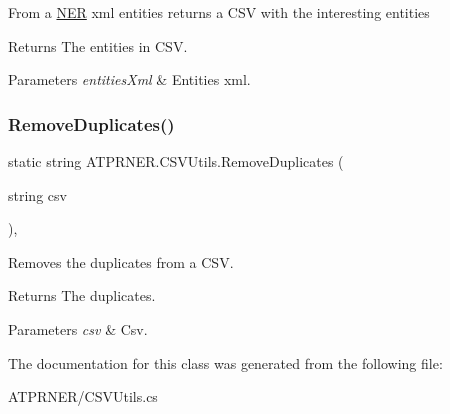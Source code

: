 From a \hyperlink{class_a_t_p_r_n_e_r_1_1_n_e_r}{N\+ER} xml entities returns a C\+SV with the interesting entities 

\begin{DoxyReturn}{Returns}
The entities in C\+SV.
\end{DoxyReturn}

\begin{DoxyParams}{Parameters}
{\em entities\+Xml} & Entities xml.\\
\hline
\end{DoxyParams}
\hypertarget{class_a_t_p_r_n_e_r_1_1_c_s_v_utils_ab236c362e83053e0e7165aa2e45849c4}{}\label{class_a_t_p_r_n_e_r_1_1_c_s_v_utils_ab236c362e83053e0e7165aa2e45849c4} 
\subsubsection{\texorpdfstring{Remove\+Duplicates()}{RemoveDuplicates()}}
{\footnotesize\ttfamily static string A\+T\+P\+R\+N\+E\+R.\+C\+S\+V\+Utils.\+Remove\+Duplicates (\begin{DoxyParamCaption}\item[{string}]{csv }\end{DoxyParamCaption})\hspace{0.3cm}{\ttfamily [inline]}, {\ttfamily [static]}}



Removes the duplicates from a C\+SV. 

\begin{DoxyReturn}{Returns}
The duplicates.
\end{DoxyReturn}

\begin{DoxyParams}{Parameters}
{\em csv} & Csv.\\
\hline
\end{DoxyParams}


The documentation for this class was generated from the following file\+:\begin{DoxyCompactItemize}
\item 
A\+T\+P\+R\+N\+E\+R/C\+S\+V\+Utils.\+cs\end{DoxyCompactItemize}
